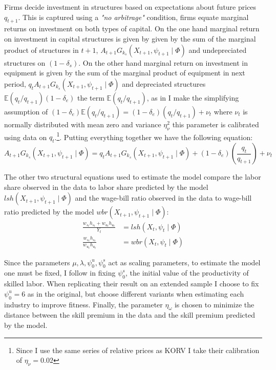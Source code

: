 \documentclass[12pt]{article}
\begin{document}
Firms decide investment in structures based on expectations about future prices $q_{t+1}$. This is captured using a \textit{"no arbitrage"} condition, firms equate marginal returns on investment on both types of capital. On the one hand marginal return on investment in capital structures is given by given by the sum of the marginal product of structures in $t+1$, $A_{t+1} G_{k_s}(X_{t+1}, \psi_{t+1} \mid \Phi )$ and undepreciated structures on $(1-\delta_s)$. On the other hand marginal return on investment in equipment is given by the sum of the marginal product of equipment in next period, $q_t A_{t+1} G_{k_s}(X_{t+1}, \psi_{t+1} \mid \Phi )$ and depreciated structures $\mathbb{E}(q_t/q_{t+1})(1-\delta_e)$ the term $\mathbb{E}(q_t/q_{t+1})$, as in \citep{krusell2000capital} I make the simplifying assumption of 
$(1-\delta_e)\mathbb{E}(q_t/q_{t+1}) =(1-\delta_e)(q_t/q_{t+1}) + \nu_t$ where $\nu_t$ is normally distributed with mean zero and variance $\eta_\nu^2$ this parameter is calibrated using data on $q_t$.\footnote{Since I use the same series of relative prices as KORV I take their calibration of $\eta_\nu = 0.02$}. Putting everything together we have the following equation:
\begin{equation}\label{eq:no_arbitrage}
 A_{t+1} G_{k_s}(X_{t+1}, \psi_{t+1} \mid \Phi ) = q_t A_{t+1} G_{k_s}(X_{t+1}, \psi_{t+1} \mid \Phi ) + (1-\delta_e)\left(\frac{q_t}{q_{t+1}}\right) + \nu_t
\end{equation}

The other two structural equations used to estimate the model compare the labor share observed in the data to labor share predicted by the model $lsh(X_{t+1}, \psi_{t+1} \mid \Phi )$ and the wage-bill ratio observed in the data to wage-bill ratio predicted by the model $wbr(X_{t+1}, \psi_{t+1} \mid \Phi )$:
\begin{align}
 \frac{w_{s_t}h_{s_t} + w_{u_t}h_{u_t} }{Y_t} &= lsh(X_{t}, \psi_{t} \mid \Phi ) \label{eq:labor_share}\\
 \frac{w_{s_t}h_{s_t}}{w_{u_t}h_{u_t}} &= wbr(X_{t}, \psi_{t} \mid \Phi ) \label{eq:wage_bill_ratio}
\end{align}

Since the parameters $\mu, \lambda, \psi^u_0, \psi^s_0$ act as scaling parameters, to estimate the model one must be fixed, I follow \citep{krusell2000capital} in fixing $\psi^s_0$, the initial value of the productivity of skilled labor. When replicating their result on an extended sample I choose to fix $\psi^u_0 = 6$ as in the original, but choose different variants when estimating each industry to improve fitness. Finally, the parameter $\eta_\omega$ is chosen to minimize the distance between the skill premium in the data and the skill premium predicted by the model.
\end{document}
